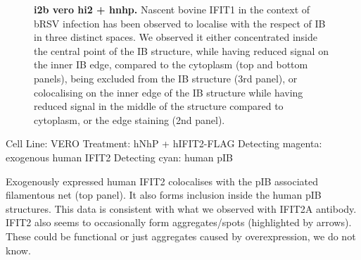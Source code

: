 \begin{figure}
\begin{subfigure}{1\textwidth}
    \end{subfigure}
    \caption[i2b vero hi2 + hnhp]{\textbf{i2b vero hi2 + hnhp.} Nascent bovine IFIT1 in the context of bRSV infection has been observed to localise with the respect of IB in three distinct spaces. We observed it either concentrated inside the central point of the IB structure, while having reduced signal on the inner IB edge, compared to the cytoplasm (top and bottom panels), being excluded from the IB structure (3rd panel), or colocalising on the inner edge of the IB structure while having reduced signal in the middle of the structure compared to cytoplasm, or the edge staining (2nd panel).}
    \label{fig:i2b vero hi2 + hnhp}
\end{figure}

Cell Line: VERO \newline
Treatment: hNhP + hIFIT2-FLAG \newline
Detecting magenta: exogenous human IFIT2 \newline
Detecting cyan: human pIB \newline

Exogenously expressed human IFIT2 colocalises with the pIB associated filamentous net (top panel). It also forms inclusion inside the human pIB structures. This data is consistent with what we observed with IFIT2A antibody. IFIT2 also seems to occasionally form aggregates/spots (highlighted by arrows). These could be functional or just aggregates caused by overexpression, we do not know.

